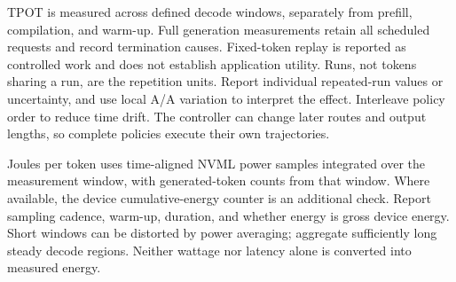 \documentclass[10pt,twocolumn]{article}
\begin{document}
TPOT is measured across defined decode windows, separately from prefill, compilation, and warm-up. Full generation measurements retain all scheduled requests and record termination causes. Fixed-token replay is reported as controlled work and does not establish application utility. Runs, not tokens sharing a run, are the repetition units. Report individual repeated-run values or uncertainty, and use local A/A variation to interpret the effect. Interleave policy order to reduce time drift. The controller can change later routes and output lengths, so complete policies execute their own trajectories.

Joules per token uses time-aligned NVML power samples integrated over the measurement window, with generated-token counts from that window. Where available, the device cumulative-energy counter is an additional check. Report sampling cadence, warm-up, duration, and whether energy is gross device energy. Short windows can be distorted by power averaging; aggregate sufficiently long steady decode regions. Neither wattage nor latency alone is converted into measured energy.
\end{document}
